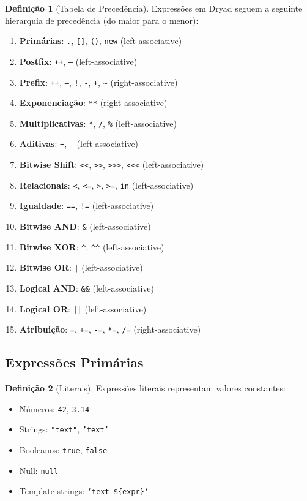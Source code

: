 \documentclass[12pt,a4paper]{article}
\theoremstyle{definition}
\newtheorem{definition}{Definição}[section]
\begin{document}
\begin{definition}[Tabela de Precedência]
Expressões em Dryad seguem a seguinte hierarquia de precedência (do maior para o menor):

\begin{enumerate}
    \item \textbf{Primárias}: \texttt{.}, \texttt{[]}, \texttt{()}, \texttt{new} (left-associative)
    \item \textbf{Postfix}: \texttt{++}, \texttt{--} (left-associative)
    \item \textbf{Prefix}: \texttt{++}, \texttt{--}, \texttt{!}, \texttt{-}, \texttt{+}, \texttt{\textasciitilde} (right-associative)
    \item \textbf{Exponenciação}: \texttt{**} (right-associative)
    \item \textbf{Multiplicativas}: \texttt{*}, \texttt{/}, \texttt{\%} (left-associative)
    \item \textbf{Aditivas}: \texttt{+}, \texttt{-} (left-associative)
    \item \textbf{Bitwise Shift}: \texttt{<<}, \texttt{>>}, \texttt{>>>}, \texttt{<<<} (left-associative)
    \item \textbf{Relacionais}: \texttt{<}, \texttt{<=}, \texttt{>}, \texttt{>=}, \texttt{in} (left-associative)
    \item \textbf{Igualdade}: \texttt{==}, \texttt{!=} (left-associative)
    \item \textbf{Bitwise AND}: \texttt{\&} (left-associative)
    \item \textbf{Bitwise XOR}: \texttt{\textasciicircum}, \texttt{\textasciicircum\textasciicircum} (left-associative)
    \item \textbf{Bitwise OR}: \texttt{|} (left-associative)
    \item \textbf{Logical AND}: \texttt{\&\&} (left-associative)
    \item \textbf{Logical OR}: \texttt{||} (left-associative)
    \item \textbf{Atribuição}: \texttt{=}, \texttt{+=}, \texttt{-=}, \texttt{*=}, \texttt{/=} (right-associative)
\end{enumerate}
\end{definition}

\subsection{Expressões Primárias}

\begin{definition}[Literais]
Expressões literais representam valores constantes:
\begin{itemize}
    \item Números: \texttt{42}, \texttt{3.14}
    \item Strings: \texttt{"text"}, \texttt{'text'}
    \item Booleanos: \texttt{true}, \texttt{false}
    \item Null: \texttt{null}
    \item Template strings: \texttt{`text \$\{expr\}`}
\end{itemize}
\end{definition}
\end{document}
